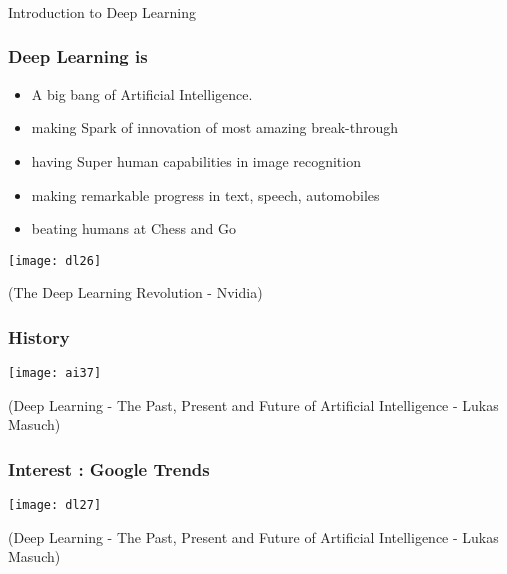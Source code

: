 \begin{frame}[fragile]\frametitle{}
\begin{center}
{\Large Introduction to Deep Learning}
\end{center}
\end{frame}


\begin{frame}[fragile]\frametitle{Deep Learning is}
\begin{itemize}
\item A big bang of Artificial Intelligence.
\item making Spark of innovation of most amazing break-through
\item having Super human capabilities in image recognition
\item making remarkable progress in text, speech, automobiles
\item beating humans at Chess and Go
\end{itemize}
\begin{center}
\texttt{[image: dl26]}
\end{center}
{\tiny (The Deep Learning Revolution - Nvidia)}
\end{frame}

\begin{frame}[fragile]\frametitle{History}
\begin{center}
\texttt{[image: ai37]}
\end{center}
{\tiny (Deep Learning - The Past, Present and Future of Artificial Intelligence - Lukas Masuch)}
\end{frame}


\begin{frame}[fragile]\frametitle{Interest : Google Trends}
\begin{center}
\texttt{[image: dl27]}
\end{center}
{\tiny (Deep Learning - The Past, Present and Future of Artificial Intelligence - Lukas Masuch)}
\end{frame}

